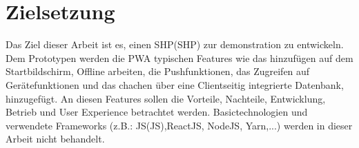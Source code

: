 \newpage
\section{Zielsetzung}\label{sub:Zielsetzung}
Das Ziel dieser Arbeit ist es, einen \acl{SHP}(\acs{SHP}) zur demonstration zu entwickeln. 
Dem Prototypen werden die \acs{PWA} typischen Features wie das hinzufügen auf dem Startbildschirm, Offline arbeiten, die Pushfunktionen, 
das Zugreifen auf Gerätefunktionen und das chachen über eine Clientseitig integrierte Datenbank, hinzugefügt. 
An diesen Features sollen die Vorteile, Nachteile, Entwicklung, Betrieb und User Experience betrachtet werden.
Basictechnologien und verwendete Frameworks (z.B.: \acl{JS}(\acs{JS}),ReactJS, NodeJS, Yarn,...) werden in dieser Arbeit nicht behandelt.

